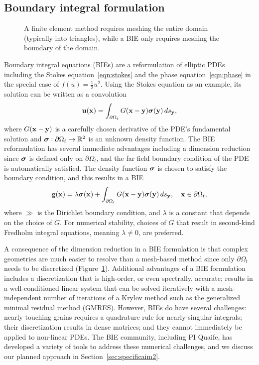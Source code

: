 \subsection{Boundary integral formulation}

\begin{figure}
  \caption{\label{fig:fem_vs_bie} \footnotesize A finite element method
  requires meshing the entire domain (typically into triangles), while a
  BIE only requires meshing the boundary of the domain.}
\end{figure}
Boundary integral equations (BIEs) are a reformulation of elliptic PDEs
including the Stokes equation~\eqref{eqn:stokes} and the phase
equation~\eqref{eqn:phase} in the special case of $f(u) =
\tfrac{1}{2}u^2$. Using the Stokes equation as an example, its solution
can be written as a convolution 
\begin{align*}
  \mathbf{u}(\mathbf{x}) = \int_{\partial\Omega_t} G(\mathbf{x} - \mathbf{y}) \boldsymbol{\sigma}(\mathbf{y}) \, ds_{\mathbf{y}},
\end{align*}
where $G(\mathbf{x} - \mathbf{y})$ is a carefully chosen derivative of the PDE's
fundamental solution and $\boldsymbol{\sigma}: \partial \Omega_t \rightarrow \mathbb{R}^2$
is an unknown density function. The BIE reformulation has several
immediate advantages including a dimension reduction since $\boldsymbol{\sigma}$ is
defined only on $\partial \Omega_t$, and the far field boundary
condition of the PDE is automatically satisfied. The density
function $\boldsymbol{\sigma}$ is chosen to satisfy the boundary condition, and this
results in a BIE 
\begin{align*}
  \mathbf{g}(\mathbf{x}) = \lambda \boldsymbol{\sigma}(\mathbf{x}) + 
    \int_{\partial\Omega_t} G(\mathbf{x} - \mathbf{y}) \boldsymbol{\sigma}(\mathbf{y}) \, ds_{\mathbf{y}},
    \quad \mathbf{x} \in \partial\Omega_t,
\end{align*}
where $\gg$ is the Dirichlet boundary condition, and $\lambda$ is a
constant that depends on the choice of $G$. For numerical stability,
choices of $G$ that result in second-kind Fredholm integral equations,
meaning $\lambda \neq 0$, are preferred.

A consequence of the dimension reduction in a BIE formulation is that
complex geometries are much easier to resolve than a mesh-based method
since only $\partial \Omega_t$ needs to be discretized
(Figure~\ref{fig:fem_vs_bie}). Additional advantages of a BIE
formulation includes a discretization that is high-order, or even
spectrally, accurate; results in a well-conditioned linear system that
can be solved iteratively with a mesh-independent number of iterations
of a Krylov method such as the generalized minimal residual method
(GMRES). However, BIEs do have several challenges: nearly touching
grains requires a quadrature rule for nearly-singular integrals; their
discretization results in dense matrices; and they cannot immediately be
applied to non-linear PDEs. The BIE community, including PI Quaife, has
developed a variety of tools to address these numerical challenges, and
we discuss our planned approach in Section~\ref{sec:specificaim2}.


